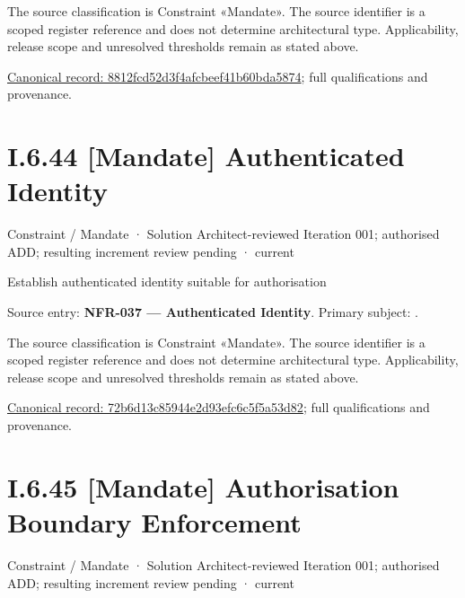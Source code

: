 The source classification is Constraint «Mandate». The source identifier is a scoped register reference and does not determine architectural type. Applicability, release scope and unresolved thresholds remain as stated above.


{\footnotesize \href{../../../../continuum/motivation/constraint/mandate/8812fcd52d3f4afcbeef41b60bda5874.md}{Canonical record: 8812fcd52d3f4afcbeef41b60bda5874}; full qualifications and provenance.}\par
\section*{I.6.44 [Mandate] Authenticated Identity}
\label{navigation:I.6.44}

\label{element:72b6d13c85944e2d93efc6c5f5a53d82}
{\small Constraint / Mandate · Solution Architect-reviewed Iteration 001; authorised ADD; resulting increment review pending · current}\par

Establish authenticated identity suitable for authorisation



Source entry: \textbf{NFR-037 — Authenticated Identity}. Primary subject: \texttt{}.



The source classification is Constraint «Mandate». The source identifier is a scoped register reference and does not determine architectural type. Applicability, release scope and unresolved thresholds remain as stated above.


{\footnotesize \href{../../../../continuum/motivation/constraint/mandate/72b6d13c85944e2d93efc6c5f5a53d82.md}{Canonical record: 72b6d13c85944e2d93efc6c5f5a53d82}; full qualifications and provenance.}\par
\section*{I.6.45 [Mandate] Authorisation Boundary Enforcement}
\label{navigation:I.6.45}

\label{element:e04672ef7f2341b68c09a0348742a861}
{\small Constraint / Mandate · Solution Architect-reviewed Iteration 001; authorised ADD; resulting increment review pending · current}\par


